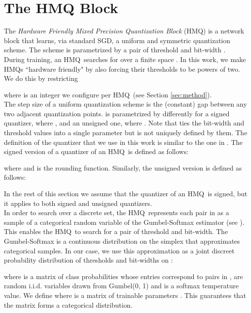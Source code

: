 \documentclass{article}
\newcommand{\qb}{HMQ}
\begin{document}
 \section{The HMQ Block}\label{sec:quant_block}
The \textit{Hardware Friendly Mixed Precision Quantization Block} (\qb) is a network block that learns, via standard SGD, a uniform and symmetric quantization scheme.
The scheme is parametrized by a pair  of threshold  and bit-width .
During training, an \qb\ searches for  over a finite space .
In this work, we make \qb s ``hardware friendly" by also forcing their thresholds to be powers of two. 
We do this by restricting 

where  is an integer we configure per \qb\ (see Section \ref{sec:method}).\\

The step size  of a uniform quantization scheme is the (constant) gap between any two adjacent quantization points.
 is parametrized by  differently for a signed quantizer, where , and an unsigned one, where . 
Note that  ties the bit-width and threshold values into a single parameter but  is not uniquely defined by them. 
The definition of the quantizer that we use in this work is similar to the one in \cite{jain2019trained}.
The signed version  of a quantizer of an \qb\ is defined as follows:

where  and  is the rounding function.
Similarly, the unsigned version  is defined as follows:

In the rest of this section we assume that the quantizer  of an \qb\ is signed, but it applies to both signed and unsigned quantizers.\\

In order to search over a discrete set, the \qb\ represents each pair in  as a sample of a categorical random variable of the Gumbel-Softmax estimator (see \cite{jang2016categorical,maddison2016concrete}).
This enables the \qb\ to search for a pair of threshold and bit-width.
The Gumbel-Softmax is a continuous distribution on the simplex that approximates categorical samples.
In our case, we use this approximation as a joint discreet probability distribution of thresholds and bit-widths \mbox{} on :

where  is a matrix of class probabilities whose entries  correspond to pairs in ,
 are random i.i.d. variables drawn from Gumbel(0, 1) and  is a softmax temperature value.
We define  where  is a matrix of trainable parameters . This guarantees that the matrix  forms a categorical distribution.
\\
\end{document}
